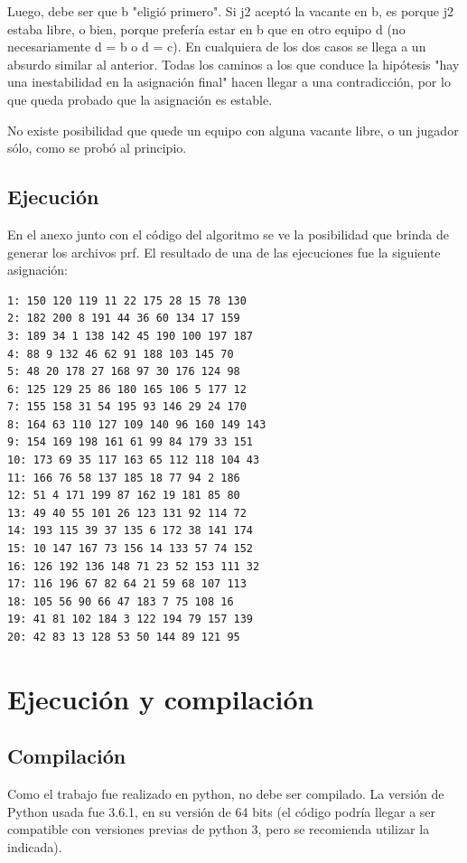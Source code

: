 \documentclass[titlepage,a4paper]{article}
\begin{document}
Luego, debe ser que b "eligió primero". Si j2 aceptó la vacante en b, es porque j2 estaba libre, o bien, porque prefería estar en b que en otro equipo d (no necesariamente d = b o d = c). En cualquiera de los dos casos se llega a un absurdo similar al anterior.
Todas los caminos a los que conduce la hipótesis "hay una inestabilidad en la asignación final" hacen llegar a una contradicción, por lo que queda probado que la asignación es estable.

No existe posibilidad que quede un equipo con alguna vacante libre, o un jugador sólo, como se probó al principio.

\subsection{Ejecución}
En el anexo junto con el código del algoritmo se ve la posibilidad que brinda de generar los archivos prf. El resultado de una de las ejecuciones fue la siguiente asignación: 

\begin{verbatim}
1: 150 120 119 11 22 175 28 15 78 130
2: 182 200 8 191 44 36 60 134 17 159
3: 189 34 1 138 142 45 190 100 197 187
4: 88 9 132 46 62 91 188 103 145 70
5: 48 20 178 27 168 97 30 176 124 98
6: 125 129 25 86 180 165 106 5 177 12
7: 155 158 31 54 195 93 146 29 24 170
8: 164 63 110 127 109 140 96 160 149 143
9: 154 169 198 161 61 99 84 179 33 151
10: 173 69 35 117 163 65 112 118 104 43
11: 166 76 58 137 185 18 77 94 2 186
12: 51 4 171 199 87 162 19 181 85 80
13: 49 40 55 101 26 123 131 92 114 72
14: 193 115 39 37 135 6 172 38 141 174
15: 10 147 167 73 156 14 133 57 74 152
16: 126 192 136 148 71 23 52 153 111 32
17: 116 196 67 82 64 21 59 68 107 113
18: 105 56 90 66 47 183 7 75 108 16
19: 41 81 102 184 3 122 194 79 157 139
20: 42 83 13 128 53 50 144 89 121 95
\end{verbatim}

\section{Ejecución y compilación}

\subsection{Compilación}
Como el trabajo fue realizado en python, no debe ser compilado. La versión de Python usada fue 3.6.1, en su versión de 64 bits (el código podría llegar a ser compatible con versiones previas de python 3, pero se recomienda utilizar la indicada).
\end{document}
